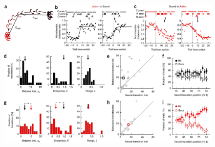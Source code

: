 \begin{figure}[htbp]

\begin{center}
\includegraphics[width=\textwidth]{Figures/Chapter3/NN_fig4} 
\end{center}


\end{figure}
